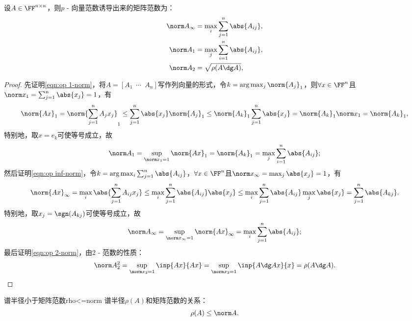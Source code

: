 \begin{example}
    {}{}
    设$A\in\FF^{n\times n}$，则$p$ - 向量范数诱导出来的矩阵范数为：
    \begin{subequations}
        \label{eqn:op norm}
        \begin{align}
            \label{eqn:op inf-norm}
            \norm A_\infty&=\max_{i}\sum_{j=1}^n\abs{A_{ij}},\\
            \label{eqn:op 1-norm}
            \norm A_1&=\max_{j}\sum_{i=1}^n\abs{A_{ij}},\\
            \label{eqn:op 2-norm}
            \norm A_2&=\sqrt{\rho(A\dg A)},
        \end{align}
    \end{subequations}
    \begin{proof}
        先证明\eqref{eqn:op 1-norm}，将$A=[A_1\enspace\cdots\enspace A_n]$写作列向量的形式，令$k=\arg\max_j\norm{A_j}_1$，则$\forall x\in\FF^n$且$\norm x_1=\sum_{j=1}^n\abs{x_j}=1$，有
        \[
            \norm{Ax}_1=\norm{\sum_{j=1}^nA_jx_j}_1\leq\sum_{j=1}^n\abs{x_j}\norm{A_j}_1\leq\norm{A_k}_1\sum_{j=1}^n\abs{x_j}=\norm{A_k}_1\norm x_1=\norm{A_k}_1,
        \]
        特别地，取$x=e_k$可使等号成立，故
        \[
            \norm A_1=\sup_{\norm x_1=1}\norm{Ax}_1=\norm{A_k}_1=\max_{j}\sum_{i=1}^n\abs{A_{ij}};
        \]
        然后证明\eqref{eqn:op inf-norm}，令$k=\arg\max_i\sum_{j=1}^n\abs{A_{ij}}$，$\forall x\in\FF^n$且$\norm x_\infty=\max_j\abs{x_j}=1$，有
        \[
            \norm{Ax}_\infty=\max_i\abs{\sum_{j=1}^nA_{ij}x_j}\leq\max_i\sum_{j=1}^n\abs{A_{ij}}\abs{x_j}\leq\max_i\sum_{j=1}^n\abs{A_{ij}}\max_j\abs{x_j}=\sum_{j=1}^n\abs{A_{kj}}.
        \]
        特别地，取$x_j=\sgn(A_{kj})$可使等号成立，故 
        \[
            \norm A_\infty=\sup_{\norm x_\infty=1}\norm{Ax}_\infty=\max_i\sum_{j=1}^n\abs{A_{ij}};
        \]
        最后证明\eqref{eqn:op 2-norm}，由2 - 范数的性质：
        \[
            \norm A_2^2=\sup_{\norm x_2=1}\inp{Ax}{Ax}=\sup_{\norm x_2=1}\inp{A\dg Ax}{x}=\rho(A\dg A).
            \qedhere
        \]
    \end{proof}
\end{example}

\begin{theorem}
    {谱半径小于矩阵范数}{rho<=norm}
    谱半径$\rho(A)$和矩阵范数的关系：
    \begin{equation}
        \label{eqn:rho<=norm}
        \rho(A)\leq\norm A.
    \end{equation}
\end{theorem}

